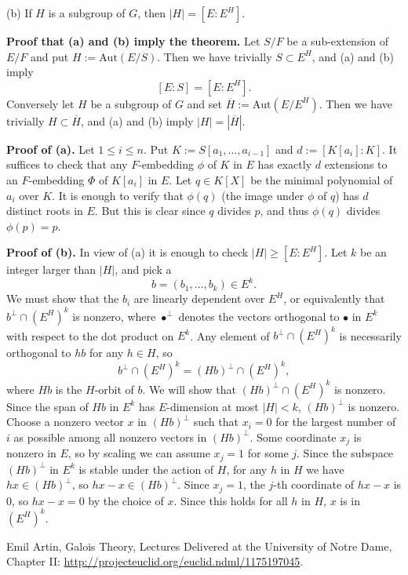 \documentclass[12pt]{article}
\newcommand{\nn}{\noindent}
\newcommand{\so}{\bigskip}
\begin{document}
(b) If $H$ is a subgroup of $G$, then $|H|=[E:E^H]$.  

\nn\textbf{Proof that (a) and (b) imply the theorem.} Let $S/F$ be a sub-extension of $E/F$ and put $H:=\text{Aut}(E/S)$. Then we have trivially $S\subset E^H$, and (a) and (b) imply 
$$
[E:S]=[E:E^H].
$$
Conversely let $H$ be a subgroup of $G$ and set $\overline H:=\text{Aut}(E/E^H)$. Then we have trivially $H\subset\overline H$, and (a) and (b) imply $|H|=|\overline H|$.

\nn\textbf{Proof of (a).} Let $1\le i\le n$. Put $K:=S[a_1,\dots,a_{i-1}]$ and $d:=[K[a_i]:K]$. It suffices to check that any $F$-embedding $\phi$ of $K$ in $E$ has exactly $d$ extensions to an $F$-embedding $\Phi$ of $K[a_i]$ in $E$. Let $q\in K[X]$ be the minimal polynomial of $a_i$ over $K$. It is enough to verify that $\phi(q)$ (the image under $\phi$ of $q$) has $d$ distinct roots in $E$. But this is clear since $q$ divides $p$, and thus $\phi(q)$ divides $\phi(p)=p$.

\nn\textbf{Proof of (b).} In view of (a) it is enough to check $|H|\ge[E:E^H]$. Let $k$ be an integer larger than $|H|$, and pick a 
$$
b=(b_1,\dots,b_k)\in E^k.
$$
We must show that the $b_i$ are linearly dependent over $E^H$, or equivalently that $b^\perp\cap(E^H)^k$ is nonzero, where $\bullet^\perp$ denotes the vectors orthogonal to $\bullet$ in $E^k$ with respect to the dot product on $E^k$. Any element of $b^\perp\cap (E^H)^k$ is necessarily orthogonal to $hb$ for any $h\in H$, so 
$$
b^\perp\cap(E^H)^k=(Hb)^\perp\cap(E^H)^k,
$$ 
where $Hb$ is the $H$-orbit of $b$. We will show that $(Hb)^\perp\cap(E^H)^k$ is nonzero. Since the span of $Hb$ in $E^k$ has $E$-dimension at most $|H|<k$, $(Hb)^\perp$ is nonzero. Choose a nonzero vector $x$ in $(Hb)^\perp$ such that $x_i=0$ for the largest number of $i$ as possible among all nonzero vectors in $(Hb)^\perp$. Some coordinate $x_j$ is nonzero in $E$, so by scaling we can assume $x_j=1$ for some $j$. Since the subspace $(Hb)^\perp$ in $E^k$ is stable under the action of $H$, for any $h$ in $H$ we have $hx \in(Hb)^\perp$, so $hx-x\in(Hb)^\perp$. Since $x_j=1$, the $j$-th coordinate of $hx-x$ is $0$, so $hx-x=0$ by the choice of $x$. Since this holds for all $h$ in $H$, $x$ is in $(E^H)^k$.\so

\nn[A] Emil Artin, Galois Theory, Lectures Delivered at the University of Notre Dame, Chapter II: 
\href{http://projecteuclid.org/euclid.ndml/1175197045}{http://projecteuclid.org/euclid.ndml/1175197045}. 

\newpage 
\end{document}
